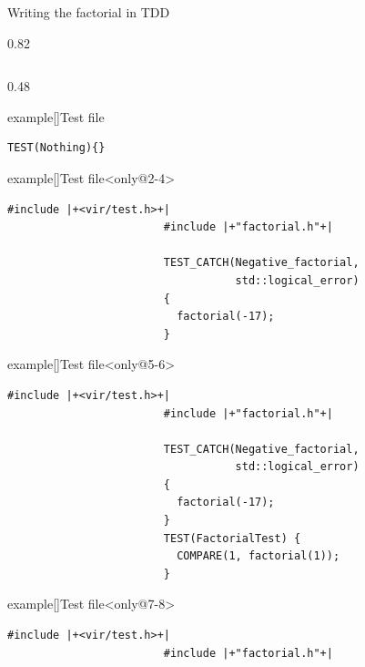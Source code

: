 \begin{frame}[fragile]{Writing the factorial in TDD}
\begin{overlayarea}{\textwidth}{0.82\textheight}
\begin{columns}[T]
\begin{column}{0.48\textwidth}
\begin{varblock}{example}[\textwidth]{Test file}
\begin{lstlisting}[style=MyCpp, belowskip=-9mm]
                        TEST(Nothing){}
                    \end{lstlisting}
                    {\scriptsize{}}
                \end{varblock}
                \begin{varblock}{example}[\textwidth]{Test file}<only@2-4>
                    \begin{lstlisting}[style=MyCpp, belowskip=-10mm]
                        #include |+<vir/test.h>+|
                        #include |+"factorial.h"+|

                        TEST_CATCH(Negative_factorial,
                                   std::logical_error)
                        {
                          factorial(-17);
                        }
                    \end{lstlisting}
                    {
                        \scriptsize
                    }
                \end{varblock}
                \begin{varblock}{example}[\textwidth]{Test file}<only@5-6>
                    \begin{lstlisting}[style=MyCpp, belowskip=-10mm]
                        #include |+<vir/test.h>+|
                        #include |+"factorial.h"+|

                        TEST_CATCH(Negative_factorial,
                                   std::logical_error)
                        {
                          factorial(-17);
                        }
                        TEST(FactorialTest) {
                          COMPARE(1, factorial(1));
                        }
                    \end{lstlisting}
                    {\scriptsize{}}
                \end{varblock}
                \begin{varblock}{example}[\textwidth]{Test file}<only@7-8>
                    \begin{lstlisting}[style=MyCpp, belowskip=-10mm]
                        #include |+<vir/test.h>+|
                        #include |+"factorial.h"+|


\end{lstlisting}
\end{varblock}
\end{column}
\end{columns}
\end{overlayarea}
\end{frame}
